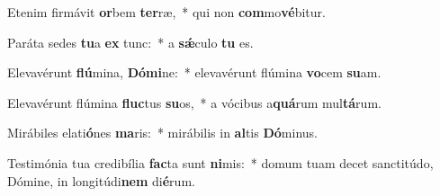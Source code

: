 \item Etenim firmávit \textbf{or}bem \textbf{ter}ræ,~* qui non \textbf{com}mo\textbf{vé}bitur.
\item Paráta sedes \textbf{tu}a \textbf{ex} tunc:~* a \textbf{sǽ}culo \textbf{tu} es.
\item Elevavérunt \textbf{flú}mina, \textbf{Dó}\textbf{mi}ne:~* elevavérunt flúmina \textbf{vo}cem \textbf{su}am.
\item Elevavérunt flúmina \textbf{fluc}tus \textbf{su}os,~* a vócibus a\textbf{quá}rum mul\textbf{tá}rum.
\item Mirábiles elati\textbf{ó}nes \textbf{ma}ris:~* mirábilis in \textbf{al}tis \textbf{Dó}minus.
\item Testimónia tua credibília \textbf{fac}ta sunt \textbf{ni}mis:~* domum tuam decet sanctitúdo, Dómine, in longitúdi\textbf{nem} di\textbf{é}rum.
